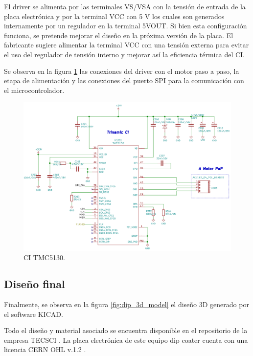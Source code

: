 El driver se alimenta por las terminales VS/VSA con la tensión de entrada de la placa electrónica y por la terminal VCC con 5 V los cuales son generados internamente  por un regulador en la terminal 5VOUT. Si bien esta configuración funciona, se pretende mejorar el diseño en la próxima versión de la placa. El fabricante sugiere alimentar la terminal VCC con una tensión externa para evitar el uso del regulador de tensión interno y mejorar así la eficiencia térmica del CI.

Se observa en la figura \ref{fig:kicad_trinamic} las conexiones del driver con el motor paso a paso, la etapa de alimentación y las conexiones del puerto SPI para la comunicación con el microcontrolador. 
 
\begin{figure}[h!]
	\centering
	\includegraphics[width=1\textwidth]{./Figures/kicad_trinamic.png}
	\caption{CI TMC5130.}
	\label{fig:kicad_trinamic}
\end{figure} 

  
\subsection{Diseño final}  
Finalmente, se observa en la figura \ref{fig:dip_3d_model} el diseño 3D generado por el software KICAD.

Todo el diseño y material asociado se encuentra disponible en el repositorio de la empresa TECSCI \citep{web_hardware_tecsci}. La placa electrónica de este equipo dip coater cuenta con una licencia CERN OHL v.1.2 \citep{web_cern_licence}.


